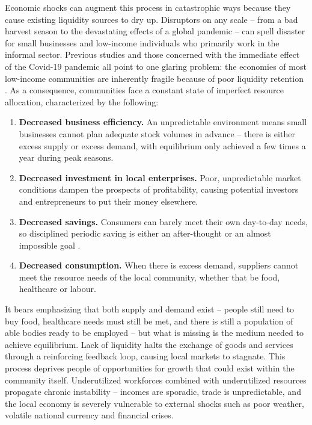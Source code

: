 \documentclass[12pt]{article}
\begin{document}
Economic shocks can augment this process in catastrophic ways because they cause existing liquidity sources to dry up. Disruptors on any scale – from a bad harvest season to the devastating effects of a global pandemic – can spell disaster for small businesses and low-income individuals who primarily work in the informal sector. Previous studies and those concerned with the immediate effect of the Covid-19 pandemic all point to one glaring problem: the economies of most low-income communities are inherently fragile because of poor liquidity retention \citep{lietaer2011new,flogel2020covid,fleischman2020liquidity}. As a consequence, communities face a constant state of imperfect resource allocation, characterized by the following:

\begin{enumerate}
    \item \textbf{Decreased business efficiency.} An unpredictable environment means small businesses cannot plan adequate stock volumes in advance – there is either excess supply or excess demand, with equilibrium only achieved a few times a year during peak seasons.
    \item \textbf{Decreased investment in local enterprises.} Poor, unpredictable market conditions dampen the prospects of profitability, causing potential investors and entrepreneurs to put their money elsewhere.
    \item \textbf{Decreased savings.} Consumers can barely meet their own day-to-day needs, so disciplined periodic saving is either an after-thought or an almost impossible goal \citep{carter2006economics}.
    \item \textbf{Decreased consumption.} When there is excess demand, suppliers cannot meet the resource needs of the local community, whether that be food, healthcare or labour.
\end{enumerate}

It bears emphasizing that both supply and demand exist – people still need to buy food, healthcare needs must still be met, and there is still a population of able bodies ready to be employed – but what is missing is the medium needed to achieve equilibrium. Lack of liquidity halts the exchange of goods and services through a reinforcing feedback loop, causing local markets to stagnate. This process deprives people of opportunities for growth that could exist within the community itself. Underutilized workforces combined with underutilized resources propagate chronic instability – incomes are sporadic, trade is unpredictable, and the local economy is severely vulnerable to external shocks such as poor weather, volatile national currency and financial crises.
\end{document}
